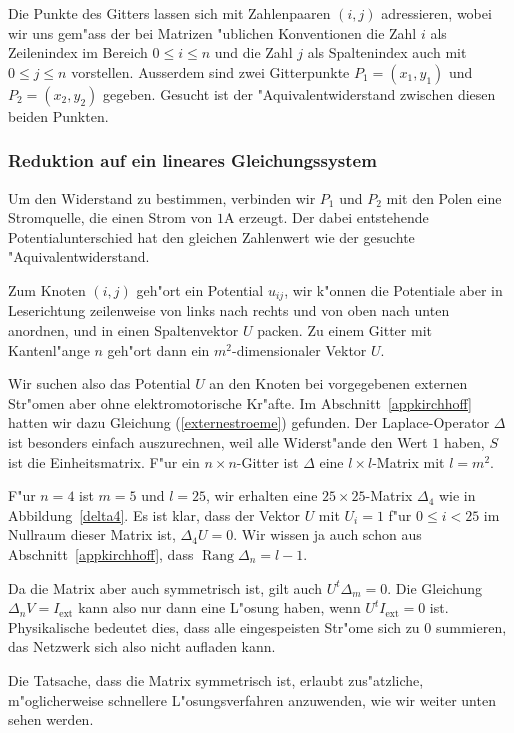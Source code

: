 Die Punkte des Gitters lassen sich mit
Zahlenpaaren $(i,j)$ adressieren, wobei wir uns gem"ass der bei Matrizen
"ublichen Konventionen die Zahl $i$ als Zeilenindex im Bereich $0\le i\le
n$ und die Zahl $j$ als Spaltenindex auch mit $0\le j\le n$ vorstellen.
Ausserdem sind zwei Gitterpunkte $P_1=(x_1,y_1)$ und $P_2=(x_2,y_2)$
gegeben. Gesucht ist der "Aquivalentwiderstand zwischen diesen beiden
Punkten.

\subsubsection{Reduktion auf ein lineares Gleichungssystem}
Um den Widerstand zu bestimmen, verbinden wir $P_1$ und $P_2$ mit den
Polen eine Stromquelle, die einen Strom von $1$A erzeugt. Der dabei
entstehende Potentialunterschied hat den gleichen Zahlenwert wie der
gesuchte "Aquivalentwiderstand. 

Zum Knoten $(i,j)$ geh"ort ein Potential $u_{ij}$, wir
k"onnen die Potentiale aber in Leserichtung zeilenweise von
links nach rechts und von oben nach unten anordnen, und in
einen Spaltenvektor $U$ packen.
Zu einem Gitter mit Kantenl"ange $n$ geh"ort dann
ein $m^2$-dimensionaler Vektor $U$.


Wir suchen also das Potential $U$ an den Knoten bei vorgegebenen
externen Str"omen aber ohne elektromotorische Kr"afte.
Im Abschnitt~\ref{appkirchhoff} hatten wir dazu Gleichung
(\ref{externestroeme}) gefunden. Der Laplace-Operator $\Delta$
ist besonders einfach auszurechnen, weil alle Widerst"ande den Wert
$1$ haben, $S$ ist die Einheitsmatrix.
F"ur ein $n\times n$-Gitter ist $\Delta$ eine $l\times l$-Matrix
mit $l=m^2$.

F"ur $n=4$ ist $m=5$ und $l=25$, wir erhalten eine $25\times 25$-Matrix
$\Delta_4$ wie in Abbildung~\ref{delta4}.
Es ist klar, dass der Vektor $U$ mit $U_i=1$ f"ur $0\le i<25$ im Nullraum
dieser Matrix ist, $\Delta_4 U=0$.
Wir wissen ja auch schon aus Abschnitt~\ref{appkirchhoff}, dass 
$\operatorname{Rang}\Delta_n=l-1$.

Da die Matrix aber auch symmetrisch ist, gilt auch $U^t\Delta_m=0$.
Die Gleichung $\Delta_nV=I_{\text{ext}}$ kann also nur dann eine
L"osung haben, wenn $U^tI_{\text{ext}}=0$ ist.
Physikalische bedeutet dies, dass alle
eingespeisten Str"ome sich zu 0 summieren, das Netzwerk sich 
also nicht aufladen kann.



Die Tatsache, dass die Matrix symmetrisch ist, erlaubt zus"atzliche,
m"oglicherweise schnellere L"osungsverfahren anzuwenden, wie wir weiter
unten sehen werden.


